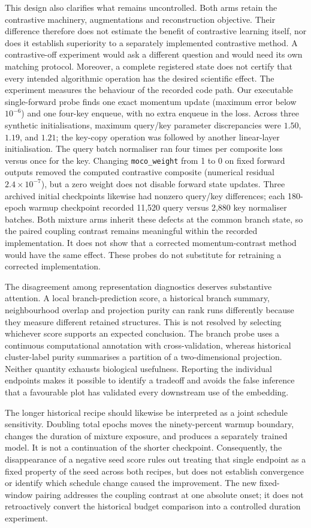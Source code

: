 \documentclass[11pt]{article}
\begin{document}
This design also clarifies what remains uncontrolled. Both arms retain the contrastive machinery, augmentations and reconstruction objective. Their difference therefore does not estimate the benefit of contrastive learning itself, nor does it establish superiority to a separately implemented contrastive method. A contrastive-off experiment would ask a different question and would need its own matching protocol. Moreover, a complete registered state does not certify that every intended algorithmic operation has the desired scientific effect. The experiment measures the behaviour of the recorded code path. Our executable single-forward probe finds one exact momentum update (maximum error below $10^{-6}$) and one four-key enqueue, with no extra enqueue in the loss. Across three synthetic initialisations, maximum query/key parameter discrepancies were $1.50$, $1.19$, and $1.21$; the key-copy operation was followed by another linear-layer initialisation. The query batch normaliser ran four times per composite loss versus once for the key. Changing \texttt{moco\_weight} from 1 to 0 on fixed forward outputs removed the computed contrastive composite (numerical residual $2.4\times10^{-7}$), but a zero weight does not disable forward state updates. Three archived initial checkpoints likewise had nonzero query/key differences; each 180-epoch warmup checkpoint recorded 11,520 query versus 2,880 key normaliser batches. Both mixture arms inherit these defects at the common branch state, so the paired coupling contrast remains meaningful within the recorded implementation. It does not show that a corrected momentum-contrast method would have the same effect. These probes do not substitute for retraining a corrected implementation.

The disagreement among representation diagnostics deserves substantive attention. A local branch-prediction score, a historical branch summary, neighbourhood overlap and projection purity can rank runs differently because they measure different retained structures. This is not resolved by selecting whichever score supports an expected conclusion. The branch probe uses a continuous computational annotation with cross-validation, whereas historical cluster-label purity summarises a partition of a two-dimensional projection. Neither quantity exhausts biological usefulness. Reporting the individual endpoints makes it possible to identify a tradeoff and avoids the false inference that a favourable plot has validated every downstream use of the embedding.

The longer historical recipe should likewise be interpreted as a joint schedule sensitivity. Doubling total epochs moves the ninety-percent warmup boundary, changes the duration of mixture exposure, and produces a separately trained model. It is not a continuation of the shorter checkpoint. Consequently, the disappearance of a negative seed score rules out treating that single endpoint as a fixed property of the seed across both recipes, but does not establish convergence or identify which schedule change caused the improvement. The new fixed-window pairing addresses the coupling contrast at one absolute onset; it does not retroactively convert the historical budget comparison into a controlled duration experiment.
\end{document}
